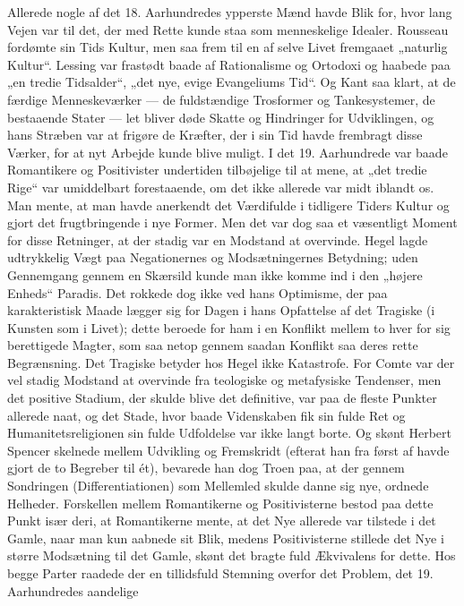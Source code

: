 \documentclass[12pt,a4paper,openany]{book}
\newcommand{\opage}[1]{\marginnote{\footnotesize\textit{[#1]}}}
\begin{document}
Allerede nogle af det 18. Aarhundredes ypperste Mænd havde Blik
for, hvor lang Vejen var til det, der med Rette kunde staa som menneskelige
Idealer. Rousseau fordømte sin Tids Kultur, men saa frem
til en af selve Livet fremgaaet „naturlig Kultur“. Lessing var frastødt
baade af Rationalisme og Ortodoxi og haabede paa „en tredie
Tidsalder“, „det nye, evige Evangeliums Tid“. Og Kant saa klart, at
de færdige Menneskeværker --- de fuldstændige Trosformer og
Tankesystemer, de bestaaende Stater --- let bliver døde Skatte og
Hindringer for Udviklingen, og hans Stræben var at frigøre de
Kræfter, der i sin Tid havde frembragt disse Værker, for at nyt Arbejde
kunde blive muligt.
I det 19. Aarhundrede var baade Romantikere og Positivister undertiden
tilbøjelige til at mene, at „det tredie Rige“ var umiddelbart
forestaaende, om det ikke allerede var midt iblandt os. Man mente,
at man havde anerkendt det Værdifulde i tidligere Tiders Kultur og
gjort det frugtbringende i nye Former. Men det var dog saa et væsentligt
Moment for disse Retninger, at der stadig var en Modstand
at overvinde. Hegel lagde udtrykkelig Vægt paa Negationernes og
Modsætningernes Betydning; uden Gennemgang gennem en Skærsild
kunde man ikke komme ind i den „højere Enheds“ Paradis.
Det rokkede dog ikke ved hans Optimisme, der paa karakteristisk
Maade lægger sig for Dagen i hans Opfattelse af det Tragiske (i
Kunsten som i Livet); dette beroede for ham i en Konflikt mellem
to hver for sig berettigede Magter, som saa netop gennem saadan
Konflikt saa deres rette Begrænsning. Det Tragiske betyder hos
Hegel ikke Katastrofe. For Comte var der vel stadig Modstand at
overvinde fra teologiske og metafysiske Tendenser, men det positive
Stadium, der skulde blive det definitive, var paa de fleste Punkter
allerede naat, og det Stade, hvor baade Videnskaben fik sin fulde Ret
og Humanitetsreligionen sin fulde Udfoldelse var ikke langt borte.
Og skønt Herbert Spencer skelnede mellem Udvikling og Fremskridt
(efterat han fra først af havde gjort de to Begreber til ét),
bevarede han dog Troen paa, at der gennem Sondringen (Differentiationen)
som Mellemled skulde danne sig nye, ordnede Helheder.
Forskellen mellem Romantikerne og Positivisterne bestod paa dette
Punkt især deri, at Romantikerne mente, at det Nye allerede var tilstede
i det Gamle, naar man kun aabnede sit Blik, medens Positivisterne
stillede det Nye i større Modsætning til det Gamle, skønt det
\opage{154}bragte fuld Ækvivalens for dette. Hos begge Parter raadede der en
tillidsfuld Stemning overfor det Problem, det 19. Aarhundredes aandelige
\end{document}
